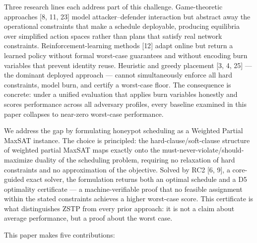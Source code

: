\documentclass[
  11pt,
]{article}
\begin{document}
Three research lines each address part of this challenge. Game-theoretic
approaches {[}8, 11, 23{]} model attacker--defender interaction but
abstract away the operational constraints that make a schedule
deployable, producing equilibria over simplified action spaces rather
than plans that satisfy real network constraints. Reinforcement-learning
methods {[}12{]} adapt online but return a learned policy without formal
worst-case guarantees and without encoding burn variables that prevent
identity reuse. Heuristic and greedy placement {[}3, 4, 25{]} --- the
dominant deployed approach --- cannot simultaneously enforce all hard
constraints, model burn, and certify a worst-case floor. The consequence
is concrete: under a unified evaluation that applies burn variables
honestly and scores performance across all adversary profiles, every
baseline examined in this paper collapses to near-zero worst-case
performance.

We address the gap by formulating honeypot scheduling as a Weighted
Partial MaxSAT instance. The choice is principled: the
hard-clause/soft-clause structure of weighted partial MaxSAT maps
exactly onto the must-never-violate/should-maximize duality of the
scheduling problem, requiring no relaxation of hard constraints and no
approximation of the objective. Solved by RC2 {[}6, 9{]}, a core-guided
exact solver, the formulation returns both an optimal schedule and a D5
optimality certificate --- a machine-verifiable proof that no feasible
assignment within the stated constraints achieves a higher worst-case
score. This certificate is what distinguishes ZSTP from every prior
approach: it is not a claim about average performance, but a proof about
the worst case.

This paper makes five contributions:
\end{document}
